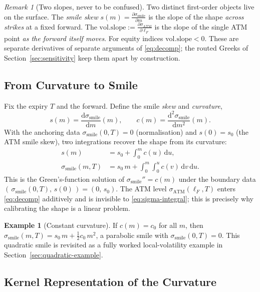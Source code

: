 \documentclass[11pt]{book}
\theoremstyle{plain}
\theoremstyle{definition}
\newtheorem{example}[theorem]{Example}
\theoremstyle{remark}
\newtheorem{remark}[theorem]{Remark}
\newcommand{\mln}{m}                             %
\newcommand{\lF}{\ell_F}                         %
\newcommand{\ssm}{\sigma_{\mathrm{smile}}}       %
\newcommand{\satm}{\sigma_{\mathrm{ATM}}}        %
\newcommand{\volslope}{\mathrm{vol.slope}}       %
\newcommand{\dd}{\mathrm{d}}                                  %
\newcommand{\pd}[2]{\frac{\partial #1}{\partial #2}}          %
\newcommand{\td}[2]{\frac{\dd #1}{\dd #2}}                    %
\begin{document}
\begin{remark}[Two slopes, never to be confused]\label{rem:two-slopes}
Two distinct first-order objects live on the surface. The \emph{smile skew}
$s(\mln) = \pd{\ssm}{\mln}$ is the slope of the shape \emph{across strikes} at a
fixed forward. The \emph{$\volslope := \pd{\satm}{\lF}$} is the slope of the
single ATM point \emph{as the forward itself moves}. For equity indices
$\volslope < 0$. These are separate derivatives of separate arguments of
\eqref{eq:decomp}; the routed Greeks of Section~\ref{sec:sensitivity} keep
them apart by construction.
\end{remark}

\subsection{From Curvature to Smile}
\label{sec:curv-to-smile}

Fix the expiry $T$ and the forward. Define the smile \emph{skew} and
\emph{curvature},
\[
s(\mln) = \td{\ssm}{\mln}(\mln), \qquad
c(\mln) = \frac{\dd^2 \ssm}{\dd \mln^2}(\mln).
\]
With the anchoring data $\ssm(0,T) = 0$ (normalisation) and $s(0) = s_0$ (the
ATM smile skew), two integrations recover the shape from its curvature:
\begin{align}
s(\mln)   &= s_0 + \int_0^{\mln} c(u)\,\dd u, \label{eq:skew-integral}\\
\ssm(\mln,T) &= s_0\,\mln + \int_0^{\mln}\!\!\int_0^{u} c(v)\,\dd v\,\dd u.
\label{eq:sigma-integral}
\end{align}
This is the Green's-function solution of $\ssm'' = c(\mln)$ under the boundary
data $(\,\ssm(0,T),\,s(0)\,) = (0,\,s_0)$. The ATM level $\satm(\lF,T)$ enters
\eqref{eq:decomp} additively and is invisible to \eqref{eq:sigma-integral};
this is precisely why calibrating the shape is a linear problem.

\begin{example}[Constant curvature]\label{ex:const-curv}
If $c(\mln) = c_0$ for all $\mln$, then
$\ssm(\mln,T) = s_0\,\mln + \tfrac{1}{2}c_0\,\mln^2$, a parabolic smile with
$\ssm(0,T)=0$. This quadratic smile is revisited as a fully worked local-volatility
example in Section~\ref{sec:quadratic-example}.
\end{example}

\subsection{Kernel Representation of the Curvature}
\label{sec:kernel-rep}
\end{document}
